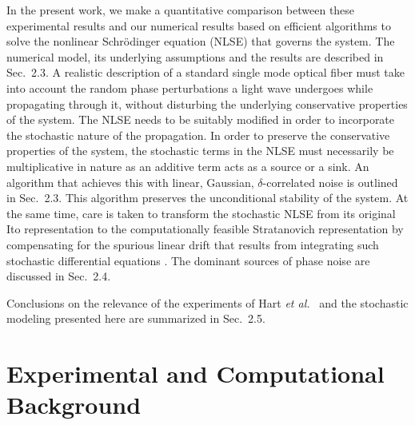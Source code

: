 In the present work, we make a quantitative comparison between these
experimental results and our numerical results based on efficient algorithms
\cite{Agrawal2} to solve the nonlinear Schr\"odinger equation (NLSE) that
governs the system. The numerical model, its underlying assumptions and
the results are described in Sec.\ 2.3. A realistic description of a
standard single mode optical fiber must take into account the random phase
perturbations a light wave undergoes while propagating through it, without
disturbing the underlying conservative properties of the system. The NLSE
needs to be suitably modified in order to incorporate the stochastic nature
of the propagation. In order to preserve the conservative properties of the
system, the stochastic terms in the NLSE must necessarily be multiplicative in
nature as an additive term acts as a source or a sink. An algorithm that
achieves this with linear, Gaussian, $\delta$-correlated noise is outlined in
Sec.\ 2.3. This algorithm preserves the unconditional stability of the
system. At the same time, care is taken to transform the stochastic NLSE from
its original Ito representation \cite{ito} to the computationally feasible Stratanovich
representation \cite{stratanovich} by compensating for the
spurious linear drift that results from integrating such stochastic
differential equations \cite{risken,werner2,drummond1,carter3}. The dominant
sources of phase noise are discussed in Sec.\ 2.4.

Conclusions on the relevance of the experiments of Hart {\it et al.}\ \cite{hart1}
and the stochastic modeling presented here are summarized in Sec.\ 2.5.

\section{Experimental and Computational Background}

